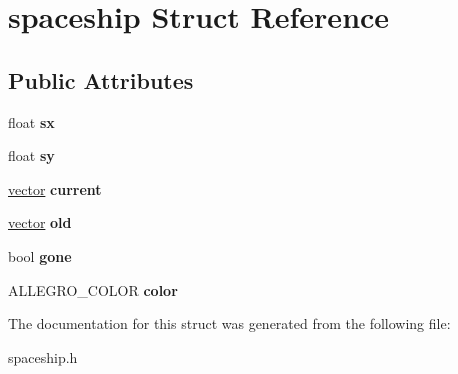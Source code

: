 \hypertarget{structspaceship}{}\section{spaceship Struct Reference}
\label{structspaceship}
\subsection*{Public Attributes}
\begin{DoxyCompactItemize}
\item 
\hypertarget{structspaceship_ac1cbe48e57320714b38bedd0381594d7}{}float {\bfseries sx}\label{structspaceship_ac1cbe48e57320714b38bedd0381594d7}

\item 
\hypertarget{structspaceship_adfcf255b8d5d1390edcb40b1d8624f89}{}float {\bfseries sy}\label{structspaceship_adfcf255b8d5d1390edcb40b1d8624f89}

\item 
\hypertarget{structspaceship_a7400716ae46ff66d923cae3f2418e9ad}{}\hyperlink{structvector}{vector} {\bfseries current}\label{structspaceship_a7400716ae46ff66d923cae3f2418e9ad}

\item 
\hypertarget{structspaceship_a29845ad7cf6d27a9bc425693b866ee2d}{}\hyperlink{structvector}{vector} {\bfseries old}\label{structspaceship_a29845ad7cf6d27a9bc425693b866ee2d}

\item 
\hypertarget{structspaceship_a6326a348dfb3c2a9b88c16d895285e60}{}bool {\bfseries gone}\label{structspaceship_a6326a348dfb3c2a9b88c16d895285e60}

\item 
\hypertarget{structspaceship_afa35a0f8063349a5bc623824fcb75fa7}{}A\+L\+L\+E\+G\+R\+O\+\_\+\+C\+O\+L\+O\+R {\bfseries color}\label{structspaceship_afa35a0f8063349a5bc623824fcb75fa7}

\end{DoxyCompactItemize}


The documentation for this struct was generated from the following file\+:\begin{DoxyCompactItemize}
\item 
spaceship.\+h\end{DoxyCompactItemize}
